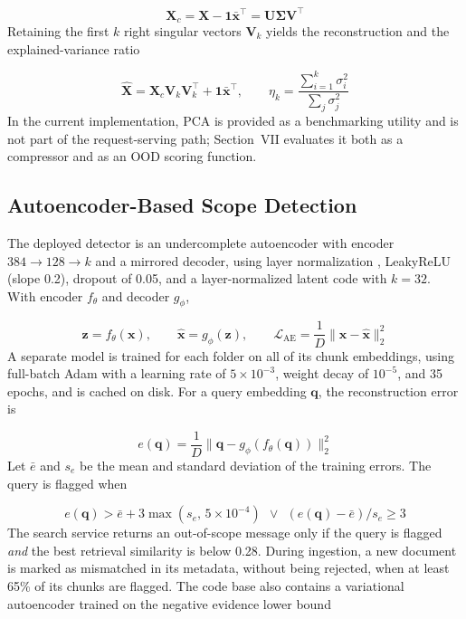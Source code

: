 \documentclass[conference]{IEEEtran}
\begin{document}
\begin{equation}
\mathbf{X}_c=\mathbf{X}-\mathbf{1}\bar{\mathbf{x}}^{\top}=\mathbf{U}\mathbf{\Sigma}\mathbf{V}^{\top}
\label{eq:svd}
\end{equation}
Retaining the first $k$ right singular vectors $\mathbf{V}_k$ yields the reconstruction and the explained-variance ratio

\begin{equation}
\hat{\mathbf{X}}=\mathbf{X}_c\mathbf{V}_k\mathbf{V}_k^{\top}+\mathbf{1}\bar{\mathbf{x}}^{\top},\qquad \eta_k=\frac{\sum_{i=1}^{k}\sigma_i^2}{\sum_{j}\sigma_j^2}
\label{eq:pca}
\end{equation}
In the current implementation, PCA is provided as a benchmarking utility and is not part of the request-serving path; Section~VII evaluates it both as a compressor and as an OOD scoring function.

\subsection{Autoencoder-Based Scope Detection}
The deployed detector is an undercomplete autoencoder with encoder $384\rightarrow128\rightarrow k$ and a mirrored decoder, using layer normalization \cite{ba2016}, LeakyReLU (slope 0.2), dropout of 0.05, and a layer-normalized latent code with $k=32$. With encoder $f_\theta$ and decoder $g_\phi$,

\begin{equation}
\mathbf{z}=f_\theta(\mathbf{x}),\qquad \hat{\mathbf{x}}=g_\phi(\mathbf{z}),\qquad \mathcal{L}_{\mathrm{AE}}=\frac{1}{D}\|\mathbf{x}-\hat{\mathbf{x}}\|_2^2
\label{eq:ae}
\end{equation}
A separate model is trained for each folder on all of its chunk embeddings, using full-batch Adam \cite{kingma2015} with a learning rate of $5\times10^{-3}$, weight decay of $10^{-5}$, and 35 epochs, and is cached on disk. For a query embedding $\mathbf{q}$, the reconstruction error is

\begin{equation}
e(\mathbf{q})=\frac{1}{D}\|\mathbf{q}-g_\phi(f_\theta(\mathbf{q}))\|_2^2
\label{eq:err}
\end{equation}
Let $\bar{e}$ and $s_e$ be the mean and standard deviation of the training errors. The query is flagged when

\begin{equation}
e(\mathbf{q})>\bar{e}+3\max(s_e,\,5\times10^{-4})\ \ \vee\ \ (e(\mathbf{q})-\bar{e})/s_e\geq 3
\label{eq:rule}
\end{equation}
The search service returns an out-of-scope message only if the query is flagged \emph{and} the best retrieval similarity is below 0.28. During ingestion, a new document is marked as mismatched in its metadata, without being rejected, when at least 65\% of its chunks are flagged. The code base also contains a variational autoencoder \cite{kingma2014} trained on the negative evidence lower bound
\end{document}
